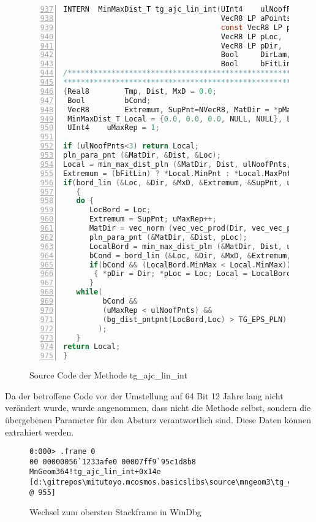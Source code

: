 \begin{figure}[H]
\begin{lstlisting}[language=C, numbers=left, firstnumber=937]
INTERN  MinMaxDist_T tg_ajc_lin_int(UInt4    ulNoofPnts,
                                    VecR8 LP aPoints,
                                    const VecR8 LP pMatDir,
                                    VecR8 LP pLoc,
                                    VecR8 LP pDir,
                                    Bool     DirLam,
                                    Bool     bFitLin)
/*************************************************************************
*************************************************************************/
{Real8        Tmp, Dist, MxD = 0.0;
 Bool         bCond;
 VecR8        Extremum, SupPnt=NVecR8, MatDir = *pMatDir, Dir = *pDir, Loc = *pLoc, LocBord;
 MinMaxDist_T Local = {0.0, 0.0, 0.0, NULL, NULL}, LocalBord = {0.0, 0.0, 0.0, NULL, NULL};
 UInt4    uMaxRep = 1;

if (ulNoofPnts<3) return Local;
pln_para_pnt (&MatDir, &Dist, &Loc);
Local = min_max_dist_pln (&MatDir, Dist, ulNoofPnts, aPoints);
Extremum = (bFitLin) ? *Local.MinPnt : *Local.MaxPnt;
if(bord_lin (&Loc, &Dir, &MxD, &Extremum, &SupPnt, ulNoofPnts, aPoints, DirLam))
   {
   do {
      LocBord = Loc;
      Extremum = SupPnt; uMaxRep++;
      MatDir = vec_norm (vec_vec_prod(Dir, vec_vec_prod(MatDir, Dir)), &Tmp);
      pln_para_pnt (&MatDir, &Dist, pLoc);
      LocalBord = min_max_dist_pln (&MatDir, Dist, ulNoofPnts, aPoints);
      bCond = bord_lin (&Loc, &Dir, &MxD, &Extremum, &SupPnt, ulNoofPnts, aPoints, DirLam);
      if(bCond && (LocalBord.MinMax < Local.MinMax))
       { *pDir = Dir; *pLoc = Loc; Local = LocalBord;}
      }
   while(
         bCond && 
         (uMaxRep < ulNoofPnts) && 
         (bg_dist_pntpnt(LocBord,Loc) > TG_EPS_PLN)
        );
   }
return Local;
}
\end{lstlisting}
\caption{Source Code der Methode tg\_ajc\_lin\_int}
\end{figure}

Da der betroffene Code vor der Umstellung auf 64 Bit 12 Jahre lang nicht verändert wurde, wurde angenommen, dass nicht die Methode selbst, sondern die übergebenen Parameter für den Absturz verantwortlich sind.
Diese Daten können extrahiert werden.

\begin{figure}[H]
\begin{lstlisting}
0:000> .frame 0
00 00000056`1233afe0 00007ff9`95c1d8b8     MnGeom364!tg_ajc_lin_int+0x14e [d:\gitrepos\mitutoyo.mcosmos.basicslibs\source\mngeom3\tg_geom.c @ 955] 
\end{lstlisting}
\caption{Wechsel zum obersten Stackframe in WinDbg}
\end{figure}

